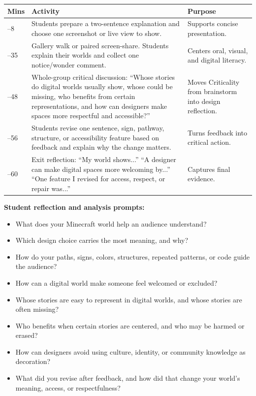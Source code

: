 \renewcommand{\arraystretch}{0.82}
\setlength{\tabcolsep}{3pt}
\begin{tabularx}{\textwidth}{|>{\raggedright\arraybackslash}p{}|Y|Y|}
\hline
{}
\textbf{Mins} & \textbf{Activity} & \textbf{Purpose} \\ --8 & Students prepare a two-sentence explanation and choose one screenshot or live view to show. & Supports concise presentation. \\ --35 & Gallery walk or paired screen-share. Students explain their worlds and collect one notice/wonder comment. & Centers oral, visual, and digital literacy. \\ --48 & Whole-group critical discussion: ``Whose stories do digital worlds usually show, whose could be missing, who benefits from certain representations, and how can designers make spaces more respectful and accessible?'' & Moves Criticality from brainstorm into design reflection. \\ --56 & Students revise one sentence, sign, pathway, structure, or accessibility feature based on feedback and explain why the change matters. & Turns feedback into critical action. \\ --60 & Exit reflection: ``My world shows...'' ``A designer can make digital spaces more welcoming by...'' ``One feature I revised for access, respect, or repair was...'' & Captures final evidence. \\ \hline
\end{tabularx}

\textbf{Student reflection and analysis prompts:}
\begin{itemize}[leftmargin=*]
    \item \textcolor{LessonTwoAccent}{What does your Minecraft world help an audience understand?}
    \item \textcolor{LessonTwoAccent}{Which design choice carries the most meaning, and why?}
    \item \textcolor{LessonTwoAccent}{How do your paths, signs, colors, structures, repeated patterns, or code guide the audience?}
    \item \textcolor{LessonTwoAccent}{How can a digital world make someone feel welcomed or excluded?}
    \item \textcolor{LessonTwoAccent}{Whose stories are easy to represent in digital worlds, and whose stories are often missing?}
    \item \textcolor{LessonTwoAccent}{Who benefits when certain stories are centered, and who may be harmed or erased?}
    \item \textcolor{LessonTwoAccent}{How can designers avoid using culture, identity, or community knowledge as decoration?}
    \item \textcolor{LessonTwoAccent}{What did you revise after feedback, and how did that change your world's meaning, access, or respectfulness?}
\end{itemize}

